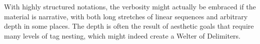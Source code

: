 \documentclass[12pt,varwidth]{standalone}
\begin{document}
With highly structured notations, the verbosity might actually be embraced if the material is narrative, with both long stretches of linear sequences and arbitrary depth in some places. The depth is often the result of aesthetic goals that require many levels of tag nesting, which might indeed create a Welter of Delimiters.
\end{document}
